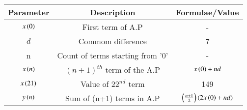 \renewcommand{\arraystretch}{2}
\begin{tabular}{|c|c|c|}
\hline 
\setlength{\tabcolsep}{1pt}
\textbf{Parameter}  &\textbf{Description} &\textbf{Formulae/Value} \\
\hline
$x\left(0\right)$ & First term of A.P & - \\
\hline
\textbf{$d$} & Commom difference & 7 \\
\hline
n & Count of terms starting from '0' & - \\
\hline
$x\left(n\right)$ & $(n+1)^{th}$ term of the A.P & $x\left(0\right) + nd$ \\
\hline
$x\left(21\right)$ & Value of $22^{nd}$ term & 149 \\

\hline
$y\left(n\right)$ & Sum of (n+1) terms in A.P & $\left(\frac{n+1}{2}\right) (2x\left(0\right)+nd)$ \\
\hline
\end{tabular}
